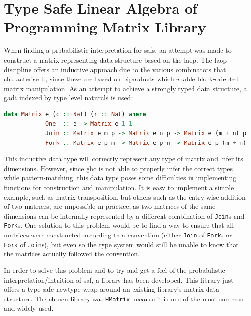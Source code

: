 \documentclass[
  oneside,
  11pt, a4paper,
  footinclude=true,
  headinclude=true,
  cleardoublepage=empty
]{scrbook}
\theoremstyle{definition}
\theoremstyle{definition}
\begin{document}
	    \section{Type Safe Linear Algebra of Programming Matrix Library}\label{sec-laop-lib1}
	    
	    When finding a probabilistic interpretation for \glspl{saf}, an attempt was made to construct a matrix-representing data structure based on the \gls{laop}. The \gls{laop} discipline offers an inductive approach due to the various combinators that characterise it, since these are based on %
	    biproducts which enable block-oriented matrix manipulation. As an attempt to achieve a strongly typed data structure, a \gls{gadt} indexed by type level naturals is used:
	    
        \begin{lstlisting}[language=Haskell, label={lst:nat-matrix}, caption={Inductive matrix definition},captionpos=b]
        data Matrix e (c :: Nat) (r :: Nat) where
            One  :: e -> Matrix e 1 1
            Join :: Matrix e m p -> Matrix e n p -> Matrix e (m + n) p
            Fork :: Matrix e p m -> Matrix e p n -> Matrix e p (m + n)
        \end{lstlisting}{}
        
        This inductive data type will correctly represent any type of matrix and infer its dimensions. However, since \gls{ghc} is not able to properly infer the correct types while pattern-matching, this data type poses some difficulties in implementing functions for construction and manipulation. It is easy to implement a simple example, such as matrix transposition, but others such as the entry-wise addition of two matrices, are impossible in practice, as two matrices of the same dimensions can be internally represented by a different combination of \texttt{Join}s and \texttt{Fork}s. One solution to this problem would be to find a way to ensure that all matrices were constructed according to a convention (either \texttt{Join} of \texttt{Fork}s or \texttt{Fork} of \texttt{Join}s), but even so the type system would still be unable to know that the matrices actually followed the convention.
	    
	    In order to solve this problem and to try and get a feel of the probabilistic interpretation/intuition of \gls{saf}, a library has been developed. This library just offers a type-safe newtype wrap around an existing library's matrix data structure. The chosen library was \texttt{HMatrix} \citep{hmatrix} because it is one of the most common and widely used.
	    
\end{document}
